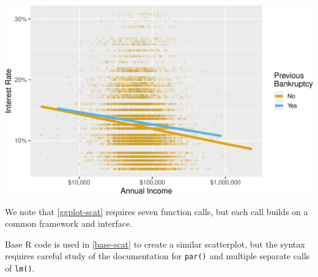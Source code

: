 \documentclass[12pt]{article}
\begin{document}
\begin{center}\includegraphics[width=0.8\linewidth]{educators-perspective-tidyverse_files/figure-latex/ggplot-scat-1} \end{center}

\label{ggplot-scat} \linespread{2}
\vspace{3mm}\setlength{\parindent}{15pt}

We note that \ref{ggplot-scat} requires seven function calls, but each
call builds on a common framework and interface.

Base R code is used in \ref{base-scat} to create a similar scatterplot,
but the syntax requires careful study of the documentation for
\texttt{par()} and multiple separate calls of \texttt{lm()}.

\linespread{1}
\end{document}
